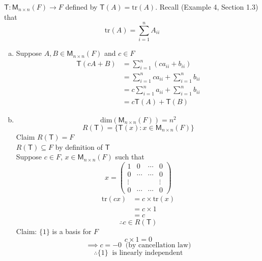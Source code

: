 $\mathsf{T}\colon\mathsf{M}_{n\times n}(F) \to F$ defined by
$\mathsf{T}(A) = \text{tr}(A)$. Recall (Example 4, Section 1.3) that
\[
\text{tr}(A) = \sum\limits_{i=1}^n A_{ii}
\]
\begin{enumerate}[(a)]
\item Suppose $A,B \in \mathsf{M}_{n\times n}(F)$ and $c\in F$
\begin{align}
\mathsf{T}(cA +B) &= \sum\limits_{i=1}^n(ca_{ii}+b_{ii})\\
&=\sum\limits_{i=1}^nca_{ii}+\sum\limits_{i=1}^nb_{ii}\\
&=c\sum\limits_{i=1}^na_{ii}+\sum\limits_{i=1}^nb_{ii}\\
&= c\mathsf{T}(A) + \mathsf{T}(B)
\end{align}
\item 
\begin{equation}
\text{dim}(\mathsf{M}_{n\times n}(F)) = n^2
\end{equation}
\begin{equation}
R(\mathsf{T}) =\{\mathsf{T}(x) \colon x \in \mathsf{M}_{n\times n}(F)\}
\end{equation}
Claim $R(\mathsf{T}) =F $
\\$R(\mathsf{T})\subseteq F$ by definition of $\mathsf{T}$
\\Suppose $c \in F$, $x \in \mathsf{M}_{n\times n}(F)$ such that 
\[
x = \begin{pmatrix}
1& 0 &\cdots & 0\\
0 & \cdots &\cdots& 0\\
\vdots & & &\vdots\\
0 & \cdots & \cdots& 0 
\end{pmatrix}
\]
\begin{align}
\text{tr}(cx) &= c\times\text{tr}(x) \\
&= c \times 1 \\
&= c
\end{align}
\begin{equation}
\therefore c \in R(\mathsf{T})
\end{equation}
Claim: $\{1\}$ is a basis for $F$
\begin{equation}
c \times 1 = 0
\end{equation}
\begin{equation}
\implies c =-0\;\; \text{(by cancellation law)}
\end{equation}
\begin{equation}
\therefore \{1\}\;\; \text{is linearly independent}
\end{equation}

\end{enumerate}
